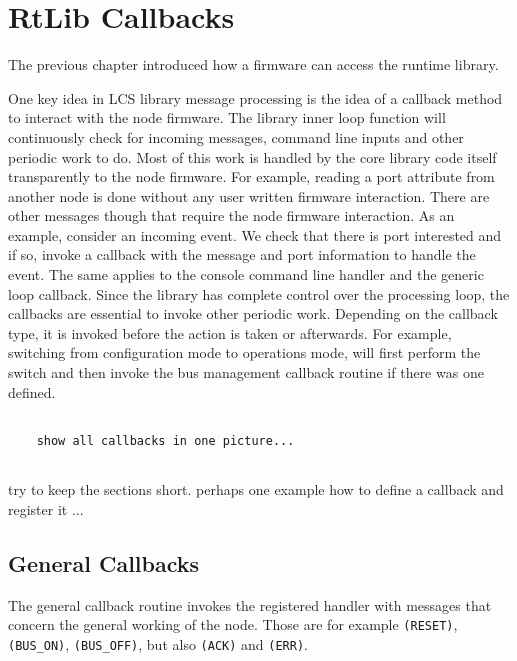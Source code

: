 \chapter{RtLib Callbacks}

The previous chapter introduced how a firmware can access the runtime library. 


One key idea in LCS library message processing is the idea of a callback method to interact with the node firmware. The library inner loop function will continuously check for incoming messages, command line inputs and other periodic work to do. Most of this work is handled by the core library code itself transparently to the node firmware. For example, reading a port attribute from another node is done without any user written firmware interaction. There are other messages though that require the node firmware interaction. As an example, consider an incoming event. We check that there is port interested and if so, invoke a callback with the message and port information to handle the event. The same applies to the console command line handler and the generic loop callback. Since the library has complete control over the processing loop, the callbacks are essential to invoke other periodic work. Depending on the callback type, it is invoked before the action is taken or afterwards. For example, switching from configuration mode to operations mode, will first perform the switch and then invoke the bus management callback routine if there was one defined.

\lstset{language=c++, style=codesnippetstyle}
\begin{lstlisting}
   
    show all callbacks in one picture...
    
\end{lstlisting}

try to keep the sections short. perhaps one example how to define a callback and register it ...

\section{General Callbacks}

The general callback routine invokes the registered handler with messages that concern the general working of the node. Those are for example \texttt{(RESET)}, \texttt{(BUS\_ON)}, \texttt{(BUS\_OFF)}, but also \texttt{(ACK)} and \texttt{(ERR)}.


